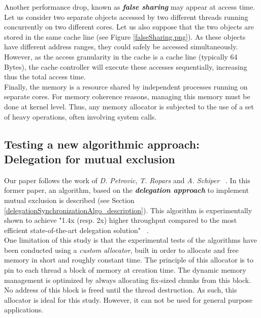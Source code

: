 \documentclass[10pt]{article}											%
\begin{document}
Another performance drop, known as \textbf{\textit{false sharing}}\cite{hoard_berger} may appear at access time.   Let us consider two separate objects accessed by two different threads running concurrently on two different cores.   Let us also suppose that the two objects are stored in the same cache line (see Figure \ref{falseSharing.png}).   As these objects have different address ranges, they could safely be accessed simultaneously.   However, as the access granularity in the cache is a cache line (typically 64 Bytes), the cache controller will execute these accesses sequentially, increasing thus the total access time.\\

Finally, the memory is a resource shared by independent processes running on separate cores.   For memory coherence reasons, managing this memory must be done at kernel level.   Thus, any memory allocator is subjected to the use of a set of heavy operations, often involving system calls.



\subsection{Testing a new algorithmic approach: Delegation for mutual exclusion}
Our paper follows the work of \textit{D. Petrovic}, \textit{T. Ropars} and \textit{A. Schiper} ~\cite{delegationCS_roparsPetrovic}.   In this former paper, an algorithm, based on the \textbf{\textit{delegation approach}} to implement mutual exclusion is described (see Section \ref{delegationSynchronizationAlgo_description}).   This algorithm is experimentally shown to achieve "1.4x (resp. 2x) higher throughput compared to the most efficient state-of-the-art delegation solution" ~\cite{delegationCS_roparsPetrovic}.\\

One limitation of this study is that the experimental tests of the algorithms have been conducted using a \textit{custom allocator}, built in order to allocate and free memory in short and roughly constant time.   The principle of this allocator is to pin to each thread a block of memory at creation time.   The dynamic memory management is optimized by always allocating fix-sized chunks from this block.   No address of this block is freed until the thread destruction.   As such, this allocator is ideal for this study.   However, it can not be used for general purpose applications.\\
\end{document}
